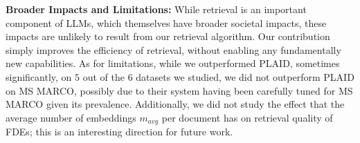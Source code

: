 \documentclass{article}
\begin{document}
\textbf{Broader Impacts and Limitations: }
While retrieval is an important component of LLMs, which themselves have broader societal impacts, these impacts are unlikely to result from our retrieval algorithm. 
Our contribution simply improves the efficiency of retrieval, without enabling any fundamentally new capabilities. As for limitations, while we outperformed PLAID, sometimes significantly, on $5$ out of the $6$ datasets we studied, we did not outperform PLAID on MS MARCO, possibly due to their system having been carefully tuned for MS MARCO given its prevalence. 
Additionally, we did not study the effect that the average number of embeddings $m_{avg}$ per document has on retrieval quality of FDEs; 
this is an interesting direction for future work. 


\newpage


\newpage

\appendix




%
\end{document}
